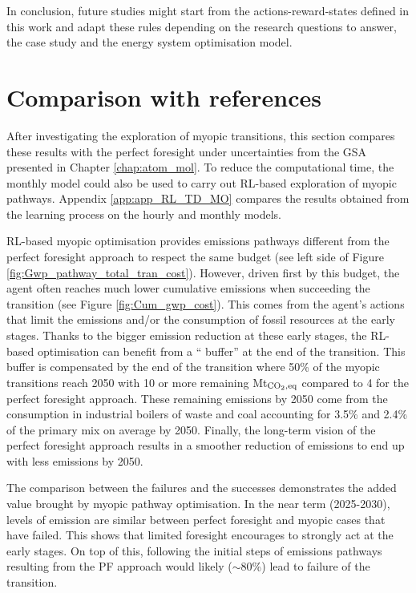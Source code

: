 In conclusion, future studies might start from the actions-reward-states defined in this work and adapt these rules depending on the research questions to answer, the case study and the energy system optimisation model.

\newpage
\section{Comparison with references}
\label{sec:RL:testing}
After investigating the exploration of myopic transitions, this section compares these results with the perfect foresight under uncertainties from the \gls{GSA} presented in Chapter \ref{chap:atom_mol}. To reduce the computational time, the monthly model could also be used to carry out \gls{RL}-based exploration of myopic pathways. Appendix \ref{app:app_RL_TD_MO} compares the results obtained from the learning process on the hourly and monthly models.

\gls{RL}-based myopic optimisation provides  emissions pathways different from the perfect foresight approach to respect the same  budget (see left side of Figure \ref{fig:Gwp_pathway_total_tran_cost}). However, driven first by this  budget, the agent often reaches much lower cumulative emissions when succeeding the transition (see Figure \ref{fig:Cum_gwp_cost}). This comes from the agent's actions that limit the emissions and/or the consumption of fossil resources at the early stages. Thanks to the bigger emission reduction at these early stages, the \gls{RL}-based optimisation can benefit from a `` buffer'' at the end of the transition. This buffer is compensated by the end of the transition where 50\% of the myopic transitions reach 2050 with 10 or more remaining Mt$_{\ce{CO2},\text{eq}}$ compared to 4 for the perfect foresight approach. These remaining emissions by 2050 come from the consumption in industrial boilers of waste and coal accounting for 3.5\% and 2.4\% of the primary mix on average by 2050. Finally, the long-term vision of the perfect foresight approach results in a smoother reduction of emissions to end up with less emissions by 2050.

The comparison between the failures and the successes demonstrates the added value brought by myopic pathway optimisation. In the near term (2025-2030), levels of emission are similar between perfect foresight and myopic cases that have failed. This shows that limited foresight encourages to strongly act at the early stages. On top of this, following the initial steps of  emissions pathways resulting from the PF approach would likely ($\sim$80\%) lead to failure of the transition. 

